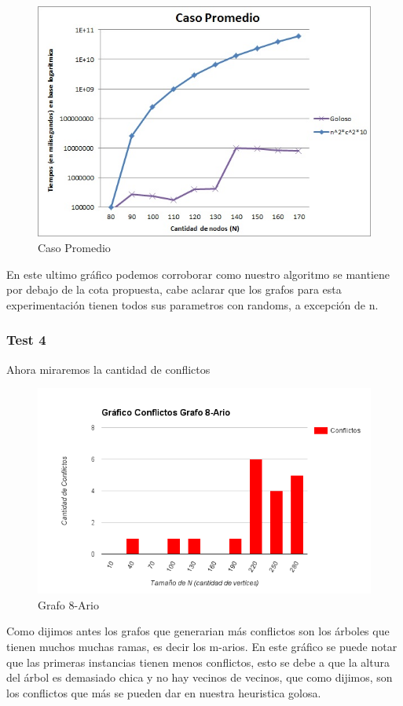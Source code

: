 \begin{figure}[H]
  \begin{center}
      \includegraphics[scale=0.75]{../Ejercicio3Promedio.jpg}
  \end{center}
  \caption{Caso Promedio}
\end{figure}

En este ultimo gráfico podemos corroborar como nuestro algoritmo se mantiene por debajo de la cota propuesta, cabe aclarar que los grafos para esta experimentaci\'on tienen todos sus parametros con randoms, a excepci\'on de n.

\subsubsection{Test 4}

\vspace*{0.3cm}
Ahora miraremos la cantidad de conflictos

\begin{figure}[H]
  \begin{center}
      \includegraphics[scale=0.75]{../Ejercicio3Conflictos8-Ario.png}
  \end{center}
  \caption{Grafo 8-Ario}
\end{figure}

Como dijimos antes los grafos que generarian más conflictos son los \'arboles que tienen muchos muchas ramas, es decir los m-arios. En este gr\'afico se puede notar que las primeras instancias tienen menos conflictos, esto se debe a que la altura del \'arbol es demasiado chica y no hay vecinos de vecinos, que como dijimos, son los conflictos que m\'as se pueden dar en nuestra heuristica golosa.
